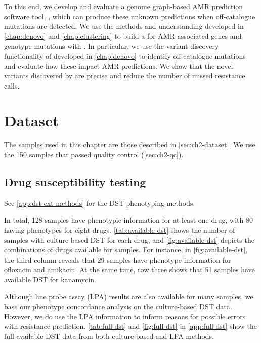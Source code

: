 To this end, we develop and evaluate a genome graph-based \mtb{} AMR prediction software tool, \drprg{}, which can produce these unknown predictions when off-catalogue mutations are detected. We use the methods and understanding developed in \autoref{chap:denovo} and \autoref{chap:clustering} to build a \mtb{} \panrg{} for AMR-associated genes and genotype mutations with \pandora{}. In particular, we use the \denovo{} variant discovery functionality of \pandora{} developed in \autoref{chap:denovo} to identify off-catalogue mutations and evaluate how these impact AMR predictions. We show that the novel variants discovered by \drprg{} are precise and reduce the number of missed resistance calls.

\section{Dataset}

The \mtb{} samples used in this chapter are those described in \autoref{sec:ch2-dataset}. We use the 150 samples that passed quality control (\autoref{sec:ch2-qc}).

\subsection{Drug susceptibility testing}
\label{sec:dst-methods}

See \autoref{app:dst-ext-methods} for the DST phenotyping methods.

\noindent
In total, 128 samples have phenotypic information for at least one drug, with 80 having phenotypes for eight drugs. \autoref{tab:available-dst} shows the number of samples with culture-based DST for each drug, and \autoref{fig:available-dst} depicts the combinations of drugs available for samples. For instance, in \autoref{fig:available-dst}, the third column reveals that 29 samples have phenotype information for ofloxacin and amikacin. At the same time, row three shows that 51 samples have available DST for kanamycin. 

Although line probe assay (LPA) results are also available for many samples, we base our phenotype concordance analysis on the culture-based DST data. However, we do use the LPA information to inform reasons for possible errors with resistance prediction. \autoref{tab:full-dst} and \autoref{fig:full-dst} in \autoref{app:full-dst} show the full available DST data from both culture-based and LPA methods.


